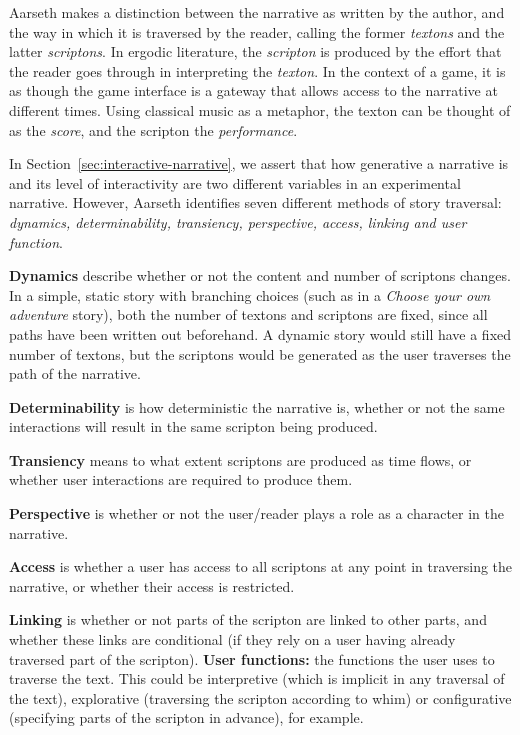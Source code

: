 \documentclass[11pt]{report}
\begin{document}
Aarseth makes a distinction between the narrative as written by the author, and the way in which it is traversed by the reader, calling the former \emph{textons} and the latter \emph{scriptons}. In ergodic literature, the \emph{scripton} is produced by the effort that the reader goes through in interpreting the \emph{texton}. In the context of a game, it is as though the game interface is a gateway that allows access to the narrative at different times. Using classical music as a metaphor, the texton can be thought of as the \emph{score}, and the scripton the \emph{performance}.

In Section~\ref{sec:interactive-narrative}, we assert that how generative a narrative is and its level of interactivity are two different variables in an experimental narrative. However, Aarseth identifies seven different methods of story traversal: \emph{dynamics, determinability, transiency, perspective, access, linking and user function}.

\textbf{Dynamics} describe whether or not the content and number of scriptons changes. In a simple, static story with branching choices (such as in a \emph{Choose your own adventure} story), both the number of textons and scriptons are fixed, since all paths have been written out beforehand. A dynamic story would still have a fixed number of textons, but the scriptons would be generated as the user traverses the path of the narrative.

\textbf{Determinability} is how deterministic the narrative is, whether or not the same interactions will result in the same scripton being produced.

\textbf{Transiency} means to what extent scriptons are produced as time flows, or whether user interactions are required to produce them.

\textbf{Perspective} is whether or not the user/reader plays a role as a character in the narrative.

\textbf{Access} is whether a user has access to all scriptons at any point in traversing the narrative, or whether their access is restricted.

\textbf{Linking} is whether or not parts of the scripton are linked to other parts, and whether these links are conditional (if they rely on a user having already traversed part of the scripton).
\textbf{User functions:} the functions the user uses to traverse the text. This could be interpretive (which is implicit in any traversal of the text), explorative (traversing the scripton according to whim) or configurative (specifying parts of the scripton in advance), for example.
\end{document}
